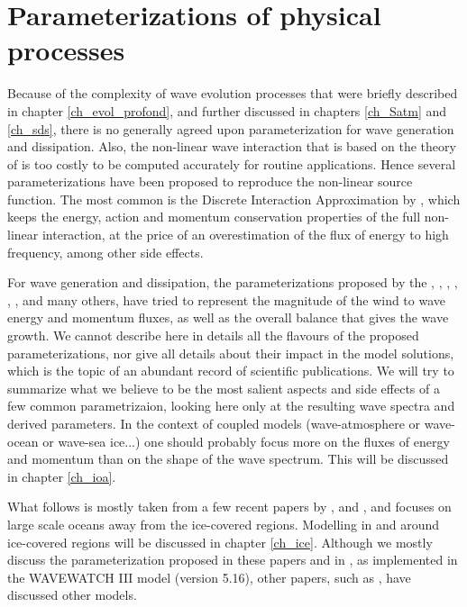 \section{Parameterizations of physical processes}
Because of the complexity of wave evolution processes that were briefly described in chapter \ref{ch_evol_profond}, and further discussed 
in chapters \ref{ch_Satm} and \ref{ch_sds}, there is no generally agreed upon parameterization for wave generation and dissipation. Also, the non-linear 
wave interaction that is based on the theory of \cite{Hasselmann1962} is too costly to be computed accurately for routine applications. Hence several 
parameterizations have been proposed to reproduce the non-linear source function. The most common is the Discrete Interaction 
Approximation by \cite{Hasselmann&al.1985b}, which keeps the energy, action and momentum conservation properties of the full non-linear interaction, 
at the price of an overestimation of the flux of energy to high frequency, among other side effects. 

For wave generation and dissipation, the parameterizations proposed by the \cite{WAMDI1988}, \cite{WAMBook}, \cite{Tolman&Chalikov1996}, 
\cite{Banner&Morison2006},  \cite{Ardhuin&al.2010}, 
\cite{Rogers&al.2012}, and many others, have tried to represent the magnitude of the wind to wave energy and momentum fluxes, as well 
as the overall balance that gives the wave growth. We cannot describe here in details all the flavours of the proposed parameterizations, nor 
give all details about their impact in the model solutions, which is the topic of an abundant record of scientific publications. We will try to 
summarize what we believe to be the most salient aspects and side effects of a few common parametrizaion, looking here only at the resulting 
wave spectra and derived parameters. In the context of coupled models (wave-atmosphere or wave-ocean or wave-sea ice...) one should probably focus more 
on the fluxes of energy and momentum than on the shape of the wave spectrum. This will be discussed in chapter \ref{ch_ioa}. 


What follows is mostly taken from a few recent papers by \cite{Rascle&Ardhuin2013}, \cite{Roland&Ardhuin2014} and \cite{Stopa&al.2016c}, and
focuses on large 
scale oceans away from the ice-covered regions. Modelling in and around ice-covered regions will be discussed in chapter \ref{ch_ice}. Although we mostly discuss the parameterization proposed in these papers and 
in \cite{Zieger&al.2015}, as implemented in the WAVEWATCH III model (version 5.16), other papers, such as \cite{vanVledder&al.2016}, have discussed other models. 


